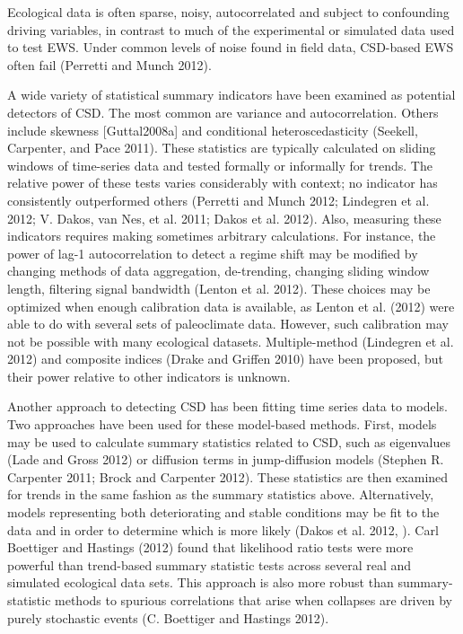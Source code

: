 \documentclass[author-year, review]{elsarticle} %
\begin{document}
Ecological data is often sparse, noisy, autocorrelated and subject to
confounding driving variables, in contrast to much of the experimental
or simulated data used to test EWS. Under common levels of noise found
in field data, CSD-based EWS often fail (Perretti and Munch 2012).

A wide variety of statistical summary indicators have been examined as
potential detectors of CSD. The most common are variance and
autocorrelation. Others include skewness {[}Guttal2008a{]} and
conditional heteroscedasticity (Seekell, Carpenter, and Pace 2011).
These statistics are typically calculated on sliding windows of
time-series data and tested formally or informally for trends. The
relative power of these tests varies considerably with context; no
indicator has consistently outperformed others (Perretti and Munch 2012;
Lindegren et al. 2012; V. Dakos, van Nes, et al. 2011; Dakos et al.
2012). Also, measuring these indicators requires making sometimes
arbitrary calculations. For instance, the power of lag-1 autocorrelation
to detect a regime shift may be modified by changing methods of data
aggregation, de-trending, changing sliding window length, filtering
signal bandwidth (Lenton et al. 2012). These choices may be optimized
when enough calibration data is available, as Lenton et al. (2012) were
able to do with several sets of paleoclimate data. However, such
calibration may not be possible with many ecological datasets.
Multiple-method (Lindegren et al. 2012) and composite indices (Drake and
Griffen 2010) have been proposed, but their power relative to other
indicators is unknown.

Another approach to detecting CSD has been fitting time series data to
models. Two approaches have been used for these model-based methods.
First, models may be used to calculate summary statistics related to
CSD, such as eigenvalues (Lade and Gross 2012) or diffusion terms in
jump-diffusion models (Stephen R. Carpenter 2011; Brock and Carpenter
2012). These statistics are then examined for trends in the same fashion
as the summary statistics above. Alternatively, models representing both
deteriorating and stable conditions may be fit to the data and in order
to determine which is more likely (Dakos et al. 2012, ). Carl Boettiger
and Hastings (2012) found that likelihood ratio tests were more powerful
than trend-based summary statistic tests across several real and
simulated ecological data sets. This approach is also more robust than
summary-statistic methods to spurious correlations that arise when
collapses are driven by purely stochastic events (C. Boettiger and
Hastings 2012).
\end{document}
